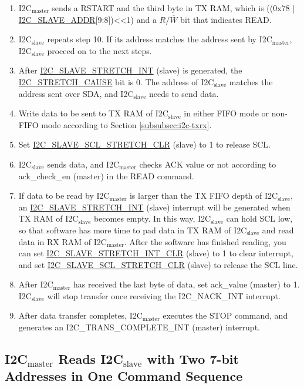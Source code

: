 \documentclass[main\_\_EN.tex]{subfiles}
\begin{document}
\begin{enumerate}
\item I2C$_\text{master}$ sends a RSTART and the third byte in TX RAM, which is ((0x78 | \hyperref[fielddesc:I2CSLAVEADDR]{I2C\_SLAVE\_ADDR}[9:8])<<1) and a $R/\overline W$ bit that indicates READ.
\item I2C$_\text{slave}$ repeats step 10. If its address matches the address sent by I2C$_\text{master}$, I2C$_\text{slave}$ proceed on to the next steps.
\item After \hyperref[int:i2c-slave-stretch]{I2C\_SLAVE\_STRETCH\_INT} (slave) is generated, the \hyperref[fielddesc:I2CSTRETCHCAUSE]{I2C\_STRETCH\_CAUSE} bit is 0. The address of I2C$_\text{slave}$ matches the address sent over SDA, and I2C$_\text{slave}$ needs to send data.
\item Write data to be sent to TX RAM of I2C$_\text{slave}$ in either FIFO mode or non-FIFO mode according to Section \ref{subsubsec:i2c-txrx}.
\item Set \hyperref[fielddesc:I2CSLAVESCLSTRETCHCLR]{I2C\_SLAVE\_SCL\_STRETCH\_CLR} (slave) to 1 to release SCL.
\item I2C$_\text{slave}$ sends data, and I2C$_\text{master}$ checks ACK value or not according to ack\_check\_en (master) in the READ command.
\item If data to be read by I2C$_\text{master}$ is larger than the TX FIFO depth of I2C$_\text{slave}$, an \hyperref[int:i2c-slave-stretch]{I2C\_SLAVE\_STRETCH\_INT} (slave) interrupt will be generated when TX RAM of I2C$_\text{slave}$ becomes empty. In this way, I2C$_\text{slave}$ can hold SCL low, so that software has more time to pad data in TX RAM of I2C$_\text{slave}$ and read data in RX RAM of I2C$_\text{master}$. After the software has finished reading, you can set \hyperref[fielddesc:I2CSLAVESTRETCHINTCLR]{I2C\_SLAVE\_STRETCH\_INT\_CLR} (slave) to 1 to clear interrupt, and set \hyperref[fielddesc:I2CSLAVESCLSTRETCHCLR]{I2C\_SLAVE\_SCL\_STRETCH\_CLR} (slave) to release the SCL line.
\item After I2C$_\text{master}$ has received the last byte of data, set ack\_value (master) to 1. I2C$_\text{slave}$ will stop transfer once receiving the I2C\_NACK\_INT interrupt.
\item After data transfer completes, I2C$_\text{master}$ executes the STOP command, and generates an I2C\_TRANS\_COMPLETE\_INT (master) interrupt.
\end{enumerate}

\subsection{\texorpdfstring{I2C$_\text{master}$ Reads I2C$_\text{slave}$ with Two 7-bit Addresses in One Command Sequence}{I2C master Reads I2C slave with Two 7-bit Addresses in One Command Sequence}}
\end{document}

